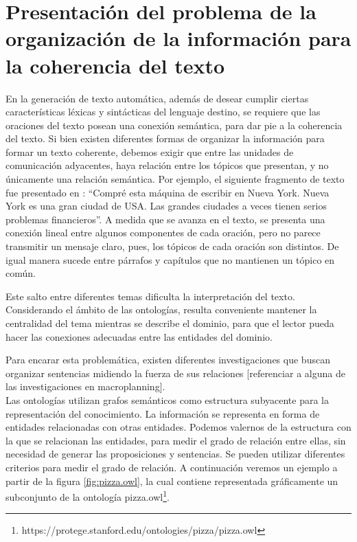 \section{Presentación del problema de la organización de la información para la coherencia del texto}
\label{sec:problema_coherencia-texto}
 En la generación de texto automática, además de desear cumplir ciertas características léxicas y sintácticas del lenguaje destino, se requiere que las oraciones del texto posean una conexión semántica, para dar pie a la coherencia del texto. 
Si bien existen diferentes formas de organizar la información para formar un texto coherente, debemos exigir que entre las unidades de comunicación adyacentes, haya relación entre los tópicos que presentan, y no únicamente una relación semántica. Por ejemplo, el siguiente fragmento de texto fue presentado en \cite{van1983ciencia}:
``Compré esta máquina de escribir en Nueva York. Nueva York es una gran ciudad de USA. Las grandes ciudades a veces tienen serios problemas financieros''. A medida que se avanza en el texto, se presenta una conexión lineal entre algunos componentes de cada oración, pero no parece transmitir un mensaje claro, pues, los tópicos de cada oración son distintos. De igual manera sucede entre párrafos y capítulos que no mantienen un tópico en común. 

Este salto entre diferentes temas dificulta la interpretación del texto. Considerando el ámbito de las ontologías, resulta conveniente mantener la centralidad del tema mientras se describe el dominio, para que el lector pueda hacer las conexiones adecuadas entre las entidades del dominio.

Para encarar esta problemática, existen diferentes investigaciones que buscan organizar sentencias midiendo la fuerza de sus relaciones [referenciar a alguna de las investigaciones en macroplanning]. 
\\

Las ontologías utilizan grafos semánticos como estructura subyacente para la representación del conocimiento. La información se representa en forma de entidades relacionadas con otras entidades. Podemos valernos de la estructura con la que se relacionan las entidades, para medir el grado de relación entre ellas, sin necesidad de generar las proposiciones y sentencias. Se pueden utilizar diferentes criterios para medir el grado de relación. A continuación veremos un ejemplo a partir de la figura \ref{fig:pizza.owl}, la cual contiene representada gráficamente un subconjunto de la ontología pizza.owl\footnote{https://protege.stanford.edu/ontologies/pizza/pizza.owl}.

